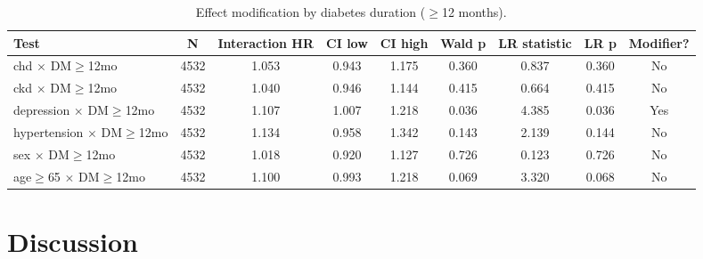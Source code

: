 \documentclass[twoside,11pt]{article}
\begin{document}
\begin{table}[h]
  \centering
  \begin{adjustbox}{max width=\textwidth}
    \begin{tabular}{lcccccccc}
      \hline
      \textbf{Test}                      & \textbf{N} & \textbf{Interaction HR} & \textbf{CI low} & \textbf{CI high} & \textbf{Wald p} & \textbf{LR statistic} & \textbf{LR p} & \textbf{Modifier?}        \\
      \hline
      chd $\times$ DM$\geq$12mo          & 4532       & 1.053                   & 0.943           & 1.175            & 0.360           & 0.837                 & 0.360         & No                        \\
      ckd $\times$ DM$\geq$12mo          & 4532       & 1.040                   & 0.946           & 1.144            & 0.415           & 0.664                 & 0.415         & No                        \\
      depression $\times$ DM$\geq$12mo   & 4532       & 1.107                   & 1.007           & 1.218            & 0.036           & 4.385                 & 0.036         & \cellcolor{lightgreen}Yes \\
      hypertension $\times$ DM$\geq$12mo & 4532       & 1.134                   & 0.958           & 1.342            & 0.143           & 2.139                 & 0.144         & No                        \\
      sex $\times$ DM$\geq$12mo          & 4532       & 1.018                   & 0.920           & 1.127            & 0.726           & 0.123                 & 0.726         & No                        \\
      age$\geq$65 $\times$ DM$\geq$12mo  & 4532       & 1.100                   & 0.993           & 1.218            & 0.069           & 3.320                 & 0.068         & No                        \\
      \hline
    \end{tabular}
  \end{adjustbox}
  \caption{Effect modification by diabetes duration ($\geq$12 months).}
  \label{tab:effect_mod}
\end{table}


\section*{Discussion}
\end{document}
